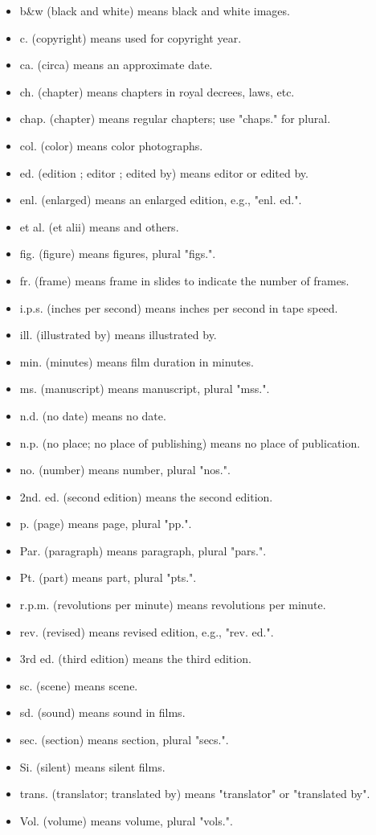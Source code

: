 \begin{itemize}
    \item b\&w (black and white) means black and white images.
    \item c. (copyright) means used for copyright year.
    \item ca. (circa) means an approximate date.
    \item ch. (chapter) means chapters in royal decrees, laws, etc.
    \item chap. (chapter) means regular chapters; use "chaps." for plural.
    \item col. (color) means color photographs.
    \item ed. (edition ; editor ; edited by) means editor or edited by.
    \item enl. (enlarged) means an enlarged edition, e.g., "enl. ed.".
    \item et al. (et alii) means and others.
    \item fig. (figure) means figures, plural "figs.".
    \item fr. (frame) means frame in slides to indicate the number of frames.
    \item i.p.s. (inches per second) means inches per second in tape speed.
    \item ill. (illustrated by) means illustrated by.
    \item min. (minutes) means film duration in minutes.
    \item ms. (manuscript) means manuscript, plural "mss.".
    \item n.d. (no date) means no date.
    \item n.p. (no place; no place of publishing) means no place of publication.
    \item no. (number) means number, plural "nos.".
    \item 2nd. ed. (second edition) means the second edition.
    \item p. (page) means page, plural "pp.".
    \item Par. (paragraph) means paragraph, plural "pars.".
    \item Pt. (part) means part, plural "pts.".
    \item r.p.m. (revolutions per minute) means revolutions per minute.
    \item rev. (revised) means revised edition, e.g., "rev. ed.".
    \item 3rd ed. (third edition) means the third edition.
    \item sc. (scene) means scene.
    \item sd. (sound) means sound in films.
    \item sec. (section) means section, plural "secs.".
    \item Si. (silent) means silent films.
    \item trans. (translator; translated by) means "translator" or "translated by".
    \item Vol. (volume) means volume, plural "vols.".
\end{itemize}


